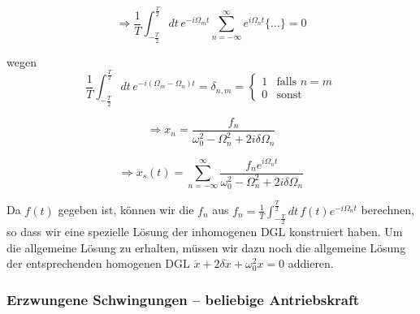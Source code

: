 \documentclass[10pt, letterpaper]{article}
\begin{document}
\[\Rightarrow \frac{1}{T}\int_{-\frac{T}{2}}^{\frac{T}{2}} dt\,e^{-i\Omega_m t}\sum_{n=-\infty}^{\infty} e^{i\Omega_n t}\{\dots\}=0\]

wegen
\[\frac{1}{T}\int_{-\frac{T}{2}}^{\frac{T}{2}} dt\,e^{-i(\Omega_m-\Omega_n)t}=\delta_{n,m}=\begin{cases}1 & \text{falls }n=m\\ 0 & \text{sonst}\end{cases}\]

\[\Rightarrow x_n=\frac{f_n}{\omega_0^2-\Omega_n^2+2i\delta\Omega_n}\]

\[\Rightarrow x_s(t)=\sum_{n=-\infty}^{\infty}\frac{f_n e^{i\Omega_n t}}{\omega_0^2-\Omega_n^2+2i\delta\Omega_n}\]

Da $f(t)$ gegeben ist, können wir die $f_n$ aus $f_n=\frac{1}{T}\int_{-\frac{T}{2}}^{\frac{T}{2}}dt\,f(t)e^{-i\Omega_n t}$ berechnen, so dass wir eine spezielle Lösung der inhomogenen DGL konstruiert haben. Um die allgemeine Lösung zu erhalten, müssen wir dazu noch die allgemeine Lösung der entsprechenden homogenen DGL $\ddot{x}+2\delta\dot{x}+\omega_0^2x=0$ addieren.







\subsubsection*{Erzwungene Schwingungen – beliebige Antriebskraft}
\end{document}
